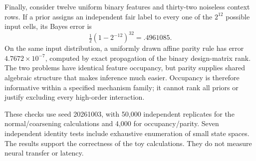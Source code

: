 \documentclass[11pt]{article}
\begin{document}
Finally, consider twelve uniform binary features and thirty-two noiseless context rows. If a prior assigns an independent fair label to every one of the $2^{12}$ possible input cells, its Bayes error is
\[
 \tfrac12(1-2^{-12})^{32}=.4961085.
\]
On the same input distribution, a uniformly drawn affine parity rule has error $4.7672\times10^{-7}$, computed by exact propagation of the binary design-matrix rank. The two problems have identical feature occupancy, but parity supplies shared algebraic structure that makes inference much easier. Occupancy is therefore informative within a specified mechanism family; it cannot rank all priors or justify excluding every high-order interaction.

These checks use seed 20261003, with 50,000 independent replicates for the normal/coarsening calculations and 4,000 for occupancy/parity. Seven independent identity tests include exhaustive enumeration of small state spaces. The results support the correctness of the toy calculations. They do not measure neural transfer or latency.
\end{document}
